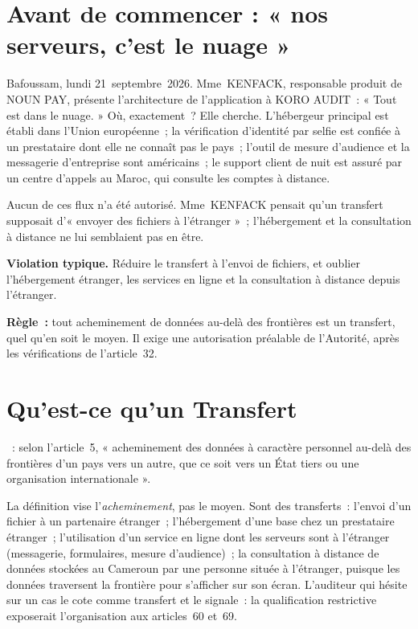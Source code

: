 \section*{Avant de commencer : « nos serveurs, c'est le nuage »}

Bafoussam, lundi 21~septembre~2026. Mme~KENFACK, responsable produit de NOUN
PAY, présente l'architecture de l'application à KORO AUDIT~: « Tout est dans
le nuage. » Où, exactement~? Elle cherche. L'hébergeur principal est
établi dans l'Union européenne~; la vérification d'identité par selfie est
confiée à un prestataire dont elle ne connaît pas le pays~; l'outil de
mesure d'audience et la messagerie d'entreprise sont américains~; le
support client de nuit est assuré par un centre d'appels au Maroc, qui
consulte les comptes à distance.

Aucun de ces flux n'a été autorisé. Mme~KENFACK pensait qu'un transfert
supposait d'« envoyer des fichiers à l'étranger »~; l'hébergement et la
consultation à distance ne lui semblaient pas en être.

\begin{boxalert}
\textbf{Violation typique.} Réduire le transfert à l'envoi de fichiers, et
oublier l'hébergement étranger, les services en ligne et la consultation
à distance depuis l'étranger.

\smallskip
\textbf{Règle~:} tout acheminement de données au-delà des frontières est un
transfert, quel qu'en soit le moyen. Il exige une autorisation préalable de
l'Autorité, après les vérifications de l'article~32.
\end{boxalert}

\section{Qu'est-ce qu'un Transfert}
\label{sec:c11-definition}

\begin{boxdef}
~: selon l'article~5,
« acheminement des données à caractère personnel au-delà des frontières
d'un pays vers un autre, que ce soit vers un État tiers ou une organisation
internationale ».
\end{boxdef}

La définition vise l'\textit{acheminement}, pas le moyen. Sont des
transferts~: l'envoi d'un fichier à un partenaire étranger~; l'hébergement
d'une base chez un prestataire étranger~; l'utilisation d'un service en
ligne dont les serveurs sont à l'étranger (messagerie, formulaires, mesure
d'audience)~; la consultation à distance de données stockées au Cameroun
par une personne située à l'étranger, puisque les données traversent la
frontière pour s'afficher sur son écran. L'auditeur qui hésite sur un cas
le cote comme transfert et le signale~: la qualification restrictive
exposerait l'organisation aux articles~60 et~69.


